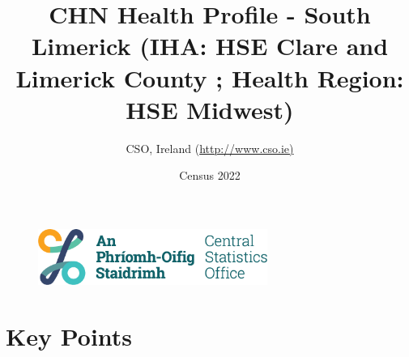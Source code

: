 \documentclass{article}
\title{CHN Health Profile - South Limerick (IHA: HSE Clare and Limerick County ;  Health Region: HSE Midwest) }
\date{Census 2022}
\author{CSO, Ireland  (\url{http://www.cso.ie)}}
\begin{document}


\begin{figure}
	\centering
\includegraphics[width =75mm]{../figures/CSO_Logo.png}
\end{figure}

				 
		   
						  
														  
																																													
												 
			 
\maketitle
					
													   
				 
						 
																																																																											   
				 
				  
  \pagebreak
    	    \tableofcontents

\pagebreak


\section{Key Points}
\end{document}
